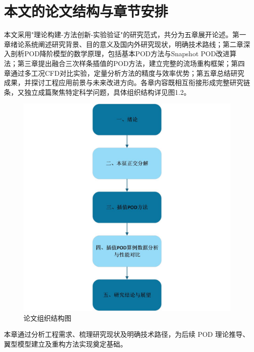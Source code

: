 \section{本文的论文结构与章节安排}
本文采用"理论构建-方法创新-实验验证"的研究范式，共分为五章展开论述。第一章绪论系统阐述研究背景、目的意义及国内外研究现状，明确技术路线；第二章深入剖析POD降阶模型的数学原理，包括基本POD方法与Snapshot POD改进算法；第三章提出融合三次样条插值的POD方法，建立完整的流场重构框架；第四章通过多工况CFD对比实验，定量分析方法的精度与效率优势；第五章总结研究成果，并探讨工程应用前景与未来改进方向。各章内容既相互衔接形成完整研究链条，又独立成篇聚焦特定科学问题，具体组织结构详见图1.2。
\begin{figure}[H]
    \centering
    \includegraphics[width=1.0\linewidth]{论文结构图.jpg}
    \caption{论文组织结构图}
    \label{fig:enter-label}
\end{figure}
本章通过分析工程需求、梳理研究现状及明确技术路径，为后续 POD 理论推导、翼型模型建立及重构方法实现奠定基础。